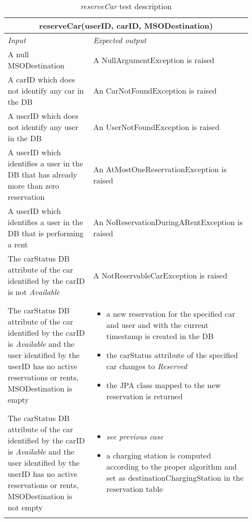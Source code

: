 \begin{longtable}{p{0.35\linewidth}p{0.65\linewidth}}
\multicolumn{2}{c}{\textbf{reserveCar(userID, carID, MSODestination)}} \\
\toprule
\emph{Input} & \emph{Expected output} \\
\midrule
A null MSODestination & A NullArgumentException is raised\\
\midrule
A carID which does not identify any car in the DB & An CarNotFoundException is raised\\
\midrule
A userID which does not identify any user in the DB & An UserNotFoundException is raised\\
\midrule
A userID which identifies a user in the DB that has already more than zero reservation & An AtMostOneReservationException is raised \\
\midrule
A userID which identifies a user in the DB that is performing a rent & An NoReservationDuringARentException is raised \\
\midrule
The carStatus DB attribute of the car identified by the carID is not \emph{Available} & A NotReservableCarException is raised \\
\midrule
The carStatus DB attribute of the car identified by the carID is \emph{Available} and the user identified by the userID has no active reservations or rents, MSODestination is empty & \begin{itemize}
	\item a new reservation for the specified car and user and with the current timestamp is created in the DB
	\item the carStatus attribute of the specified car changes to \emph{Reserved}
	\item the JPA class mapped to the new reservation is returned
\end{itemize} \\
\midrule
The carStatus DB attribute of the car identified by the carID is \emph{Available} and the user identified by the userID has no active reservations or rents, MSODestination is not empty & \begin{itemize}
\item \emph{see previous case}
\item a charging station is computed according to the proper algorithm and set as destinationChargingStation in the reservation table
\end{itemize}\\
\bottomrule
\caption{\emph{reserveCar} test description}
\end{longtable}

